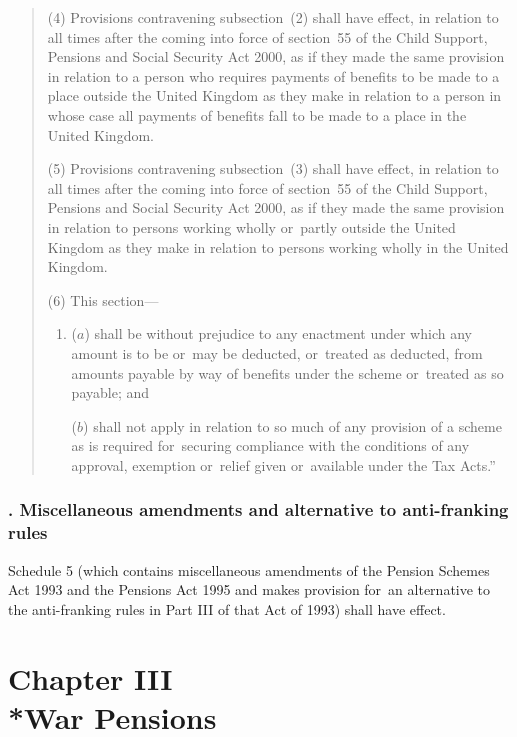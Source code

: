 \documentclass[12pt,a4paper]{article}
\begin{document}
\begin{quotation}
(4) Provisions contravening subsection~(2)  shall have effect, in relation to all times after the coming into force of section~55 of the Child Support, Pensions and Social Security Act 2000, as if they made the same provision in relation to a person who requires payments of benefits to be made to a place outside the United Kingdom as they make in relation to a person in whose case all payments of benefits fall to be made to a place in the United Kingdom.

(5) Provisions contravening subsection~(3)  shall have effect, in relation to all times after the coming into force of section~55 of the Child Support, Pensions and Social Security Act 2000, as if they made the same provision in relation to persons working wholly or~partly outside the United Kingdom as they make in relation to persons working wholly in the United Kingdom.

(6) This section—
\begin{enumerate}\item[]
($a$) shall be without prejudice to any enactment under which any amount is to be or~may be deducted, or~treated as deducted, from amounts payable by way of benefits under the scheme or~treated as so payable; and

($b$) shall not apply in relation to so much of any provision of a scheme as is required for~securing compliance with the conditions of any approval, exemption or~relief given or~available under the Tax Acts.”
\end{enumerate}
\end{quotation}

\subsubsection[56. Miscellaneous amendments and alternative to anti-franking rules]{. Miscellaneous amendments and alternative to anti-franking rules}

Schedule 5 (which contains miscellaneous amendments of the Pension Schemes Act 1993 and the Pensions Act 1995 and makes provision for~an alternative to the anti-franking rules in Part III of that Act of 1993) shall have effect.

\section[Chapter III --- War Pensions]{Chapter III\\*War Pensions}

\renewcommand\parthead{--- Part II Chapter III}
\end{document}
